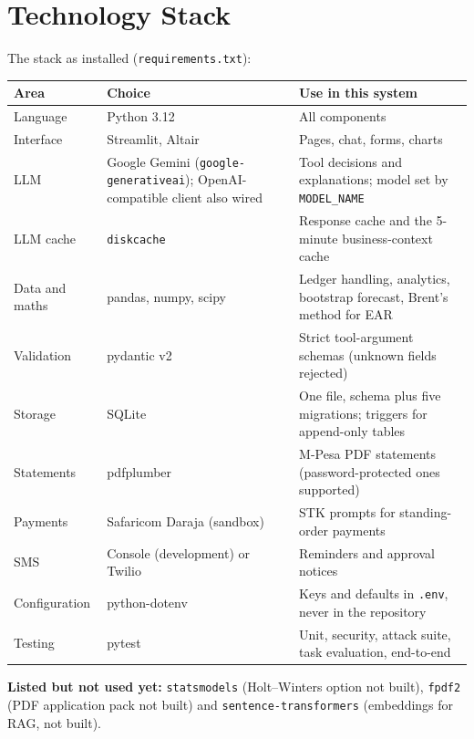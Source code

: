 \documentclass[10pt,a4paper]{article}
\newcommand{\code}[1]{\texttt{\small #1}}
\begin{document}
\section{Technology Stack}
\label{sec:stack}
The stack as installed (\code{requirements.txt}):

\begin{center}
\begin{tabularx}{\textwidth}{@{}>{\raggedright\arraybackslash}p{3cm}>{\raggedright\arraybackslash}p{4.2cm}Y@{}}
\toprule
\textbf{Area} & \textbf{Choice} & \textbf{Use in this system}\\
\midrule
Language & Python 3.12 & All components\\
Interface & Streamlit, Altair & Pages, chat, forms, charts\\
LLM & Google Gemini (\code{google-generativeai}); OpenAI-compatible client also wired & Tool decisions and explanations; model set by \code{MODEL\_NAME}\\
LLM cache & \code{diskcache} & Response cache and the 5-minute business-context cache\\
Data and maths & pandas, numpy, scipy & Ledger handling, analytics, bootstrap forecast, Brent's method for EAR\\
Validation & pydantic v2 & Strict tool-argument schemas (unknown fields rejected)\\
Storage & SQLite & One file, schema plus five migrations; triggers for append-only tables\\
Statements & pdfplumber & M-Pesa PDF statements (password-protected ones supported)\\
Payments & Safaricom Daraja (sandbox) & STK prompts for standing-order payments\\
SMS & Console (development) or Twilio & Reminders and approval notices\\
Configuration & python-dotenv & Keys and defaults in \code{.env}, never in the repository\\
Testing & pytest & Unit, security, attack suite, task evaluation, end-to-end\\
\bottomrule
\end{tabularx}
\end{center}

\textbf{Listed but not used yet:} \code{statsmodels} (Holt--Winters option not built), \code{fpdf2} (PDF application pack not built) and \code{sentence-transformers} (embeddings for RAG, not built).
\end{document}
